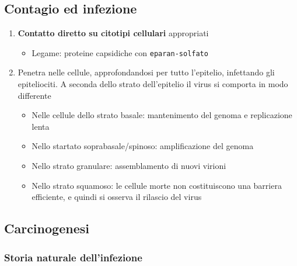 \documentclass[italian,]{article}
\providecommand{\tightlist}{%
  \setlength{\itemsep}{0pt}\setlength{\parskip}{0pt}}
\begin{document}
\hypertarget{contagio-ed-infezione}{%
\subsection{Contagio ed infezione}\label{contagio-ed-infezione}}

\begin{enumerate}
\def\labelenumi{\arabic{enumi}.}
\setcounter{enumi}{-1}
\tightlist
\item
  \textbf{Contatto diretto su citotipi cellulari} appropriati

  \begin{itemize}
  \tightlist
  \item
    Legame: proteine capsidiche con \texttt{eparan-solfato}
  \end{itemize}
\item
  Penetra nelle cellule, approfondandosi per tutto l'epitelio,
  infettando gli epiteliociti. A seconda dello strato dell'epitelio il
  virus si comporta in modo differente

  \begin{itemize}
  \tightlist
  \item
    Nelle cellule dello strato basale: mantenimento del genoma e
    replicazione lenta
  \item
    Nello startato soprabasale/spinoso: amplificazione del genoma
  \item
    Nello strato granulare: assemblamento di nuovi virioni
  \item
    Nello strato squamoso: le cellule morte non costituiscono una
    barriera efficiente, e quindi si osserva il rilascio del virus
  \end{itemize}
\end{enumerate}

\hypertarget{carcinogenesi}{%
\subsection{Carcinogenesi}\label{carcinogenesi}}

\hypertarget{storia-naturale-dellinfezione}{%
\subsubsection{Storia naturale
dell'infezione}\label{storia-naturale-dellinfezione}}
\end{document}
